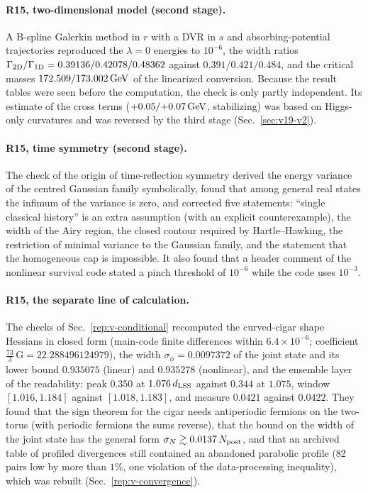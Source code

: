 \paragraph{R15, two-dimensional model (second stage).}
A B-spline Galerkin method in $r$ with a DVR in $s$ and absorbing-potential trajectories reproduced the $\lambda=0$ energies to $10^{-6}$, the width ratios $\Gamma_{\rm 2D}/\Gamma_{\rm 1D}=0.39136/\allowbreak 0.42078/\allowbreak 0.48362$ against $0.391/\allowbreak 0.421/\allowbreak 0.484$, and the critical masses $172.509/\allowbreak 173.002\,\mathrm{GeV}$ of the linearized conversion. %
Because the result tables were seen before the computation, the check is only partly independent.
Its estimate of the cross terms ($+0.05/\allowbreak{+}0.07\,\mathrm{GeV}$, stabilizing) was based on Higgs-only curvatures and was reversed by the third stage (Sec.~\ref{sec:v19-v2}).

\paragraph{R15, time symmetry (second stage).}
The check of the origin of time-reflection symmetry derived the energy variance of the centred Gaussian family symbolically, found that among general real states the infimum of the variance is zero, and corrected five statements: ``single classical history'' is an extra assumption (with an explicit counterexample), the width of the Airy region, the closed contour required by Hartle--Hawking, the restriction of minimal variance to the Gaussian family, and the statement that the homogeneous cap is impossible. %
It also found that a header comment of the nonlinear survival code stated a pinch threshold of $10^{-6}$ while the code uses $10^{-3}$.

\paragraph{R15, the separate line of calculation.}
The checks of Sec.~\ref{rep:v-conditional} recomputed the curved-cigar shape Hessians in closed form (main-code finite differences within $6.4\times10^{-6}$; coefficient $\frac{73}{3}\,\mathrm G=22.288496124979$), the width $\sigma_\phi=0.0097372$ of the joint state and its lower bound $0.935075$ (linear) and $0.935278$ (nonlinear), and the ensemble layer of the readability: peak $0.350$ at $1.076\,d_{\mathrm{LSS}}$ against $0.344$ at $1.075$, window $[1.016,1.184]$ against $[1.018,1.183]$, and measure $0.0421$ against $0.0422$. %
They found that the sign theorem for the cigar needs antiperiodic fermions on the two-torus (with periodic fermions the sums reverse), that the bound on the width of the joint state has the general form $\sigma_N\gtrsim0.0137\,N_{\rm post}$, and that an archived table of profiled divergences still contained an abandoned parabolic profile (82 pairs low by more than $1\%$, one violation of the data-processing inequality), which was rebuilt (Sec.~\ref{rep:v-convergence}).

